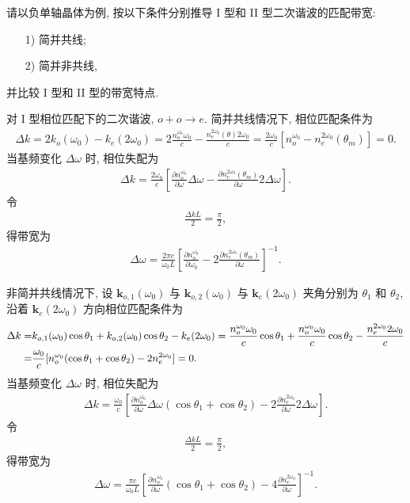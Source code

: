 \documentclass{assignment}
\begin{document}
\begin{prob}
    请以负单轴晶体为例, 按以下条件分别推导 I 型和 II 型二次谐波的匹配带宽:
    \begin{itemize}
        \item[1)] 简并共线;
        \item[2)] 简并非共线,
    \end{itemize}
    并比较 I 型和 II 型的带宽特点.
\end{prob}
\begin{pf}
    对 I 型相位匹配下的二次谐波, $o+o\rightarrow e$. 简并共线情况下, 相位匹配条件为
    \begin{align}
        \Delta k=2k_o(\omega_0)-k_e(2\omega_0)=2\frac{n_o^{\omega_0}\omega_0}{c}-\frac{n_e^{2\omega_0}(\theta)2\omega_0}{c}=\frac{2\omega_0}{c}[n_o^{\omega_0}-n_e^{2\omega_0}(\theta_m)]=0.
    \end{align}
    当基频变化 $\Delta\omega$ 时, 相位失配为
    \begin{align}
        \Delta k=\frac{2\omega_0}{c}\left[\frac{\partial n_o^{\omega_0}}{\partial\omega}\Delta\omega-\frac{\partial n_e^{2\omega_0}(\theta_m)}{\partial\omega}2\Delta\omega\right].
    \end{align}
    令
    \begin{align}
        \frac{\Delta kL}{2}=\frac{\pi}{2},
    \end{align}
    得带宽为
    \begin{align}
        \Delta\omega=\frac{2\pi c}{\omega_0L}\left[\frac{\partial n_o^{\omega_0}}{\partial\omega_0}-2\frac{\partial n_e^{2\omega_0}(\theta_m)}{\partial\omega}\right]^{-1}.
    \end{align}

    非简并共线情况下, 设 $\bm{k}_{o,1}(\omega_0)$ 与 $\bm{k}_{o,2}(\omega_0)$ 与 $\bm{k}_e(2\omega_0)$ 夹角分别为 $\theta_1$ 和 $\theta_2$, 沿着 $\bm{k}_e(2\omega_0)$ 方向相位匹配条件为
    \begin{align}
        \notag\Delta k=&k_{o,1}(\omega_0)\cos\theta_1+k_{o,2}(\omega_0)\cos\theta_2-k_e(2\omega_0)=\frac{n_o^{\omega_0}\omega_0}{c}\cos\theta_1+\frac{n_o^{\omega_0}\omega_0}{c}\cos\theta_2-\frac{n_e^{2\omega_0}2\omega_0}{c}\\
        =&\frac{\omega_0}{c}[n_o^{\omega_0}(\cos\theta_1+\cos\theta_2)-2n_e^{2\omega_0}]=0.
    \end{align}
    当基频变化 $\Delta\omega$ 时, 相位失配为
    \begin{align}
        \Delta k=\frac{\omega_0}{c}\left[\frac{\partial n_o^{\omega_0}}{\partial\omega}\Delta\omega(\cos\theta_1+\cos\theta_2)-2\frac{\partial n_e^{2\omega_0}}{\partial\omega}2\Delta\omega\right].
    \end{align} 
    令
    \begin{align}
        \frac{\Delta kL}{2}=\frac{\pi}{2},
    \end{align}
    得带宽为
    \begin{align}
        \Delta\omega=\frac{\pi c}{\omega_0L}\left[\frac{\partial n_o^{\omega_0}}{\partial\omega}(\cos\theta_1+\cos\theta_2)-4\frac{\partial n_e^{2\omega_0}}{\partial\omega}\right]^{-1}.
    \end{align}


\end{pf}
\end{document}
